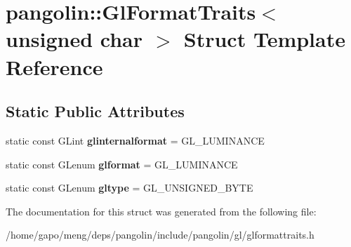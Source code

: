 \hypertarget{structpangolin_1_1_gl_format_traits_3_01unsigned_01char_01_4}{}\section{pangolin\+:\+:Gl\+Format\+Traits$<$ unsigned char $>$ Struct Template Reference}
\label{structpangolin_1_1_gl_format_traits_3_01unsigned_01char_01_4}
\subsection*{Static Public Attributes}
\begin{DoxyCompactItemize}
\item 
static const G\+Lint {\bfseries glinternalformat} = G\+L\+\_\+\+L\+U\+M\+I\+N\+A\+N\+CE\hypertarget{structpangolin_1_1_gl_format_traits_3_01unsigned_01char_01_4_a944debd68c8bd0aa04a37605a80bfce1}{}\label{structpangolin_1_1_gl_format_traits_3_01unsigned_01char_01_4_a944debd68c8bd0aa04a37605a80bfce1}

\item 
static const G\+Lenum {\bfseries glformat} = G\+L\+\_\+\+L\+U\+M\+I\+N\+A\+N\+CE\hypertarget{structpangolin_1_1_gl_format_traits_3_01unsigned_01char_01_4_a71a59bc8e3281b23adc809d90ba8e3be}{}\label{structpangolin_1_1_gl_format_traits_3_01unsigned_01char_01_4_a71a59bc8e3281b23adc809d90ba8e3be}

\item 
static const G\+Lenum {\bfseries gltype} = G\+L\+\_\+\+U\+N\+S\+I\+G\+N\+E\+D\+\_\+\+B\+Y\+TE\hypertarget{structpangolin_1_1_gl_format_traits_3_01unsigned_01char_01_4_a86f2e207eab611e5f5d1e08a6ed74eb6}{}\label{structpangolin_1_1_gl_format_traits_3_01unsigned_01char_01_4_a86f2e207eab611e5f5d1e08a6ed74eb6}

\end{DoxyCompactItemize}


The documentation for this struct was generated from the following file\+:\begin{DoxyCompactItemize}
\item 
/home/gapo/meng/deps/pangolin/include/pangolin/gl/glformattraits.\+h\end{DoxyCompactItemize}
